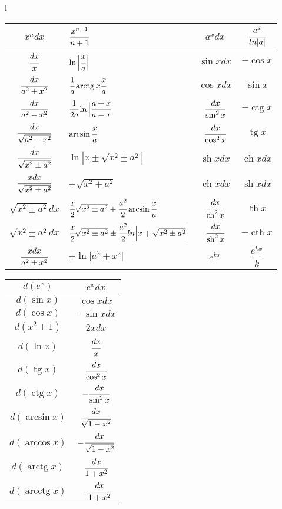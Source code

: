 

\small
\begin{tabular}{l}
	\begin{tabular}{|c|l||c|c|}
		\hline
		$x^ndx$&$\cfrac{x^{n+1}}{n+1}$&$a^xdx$&$\cfrac{a^x}{ln|a|}$\\
		\hline
		$\cfrac{dx}{x}$&$\ln\Big|\cfrac{x}{a}\Big|$&$\sin{x}dx$&$-\cos{x}$\\
		\hline
		$\cfrac{dx}{a^2+x^2}$&$\cfrac{1}{a} \operatorname{arctg} x{\cfrac{x}{a}}$&$\cos{x}dx$&$\sin{x}$\\
		\hline
		$\cfrac{dx}{a^2-x^2}$&$\cfrac{1}{2a}\ln\Big|\cfrac{a+x}{a-x}\Big|$&$\cfrac{dx}{\sin^2x}$&$-\operatorname{ctg} x$\\
		\hline
		$\cfrac{dx}{\sqrt{a^2-x^2}}$&$\arcsin\cfrac{x}{a}$&$\cfrac{dx}{\cos^2x}$&$\operatorname{tg} x$\\
		\hline
		$\cfrac{dx}{\sqrt{x^2\pm a^2}}$&$\ln|x\pm\sqrt{x^2\pm a^2}|$&$\operatorname{sh} xdx$&$\operatorname{ch} xdx$\\
		\hline
		$\cfrac{xdx}{\sqrt{x^2\pm a^2}}$&$\pm\sqrt{x^2\pm a^2}$&$\operatorname{ch}xdx$&$\operatorname{sh}xdx$\\
		\hline
		$\sqrt{x^2\pm a^2}dx$&$\cfrac{x}{2}\sqrt{x^2\pm a^2}+\cfrac{a^2}{2}\operatorname{arcsin}\cfrac{x}{a}$&$\cfrac{dx}{\operatorname{ch}^2x}$&$\operatorname{th}x$\\
		\hline
		$\sqrt{x^2\pm a^2}dx$&$\cfrac{x}{2}\sqrt{x^2\pm a^2}\pm \cfrac{a^2}{2}ln\Big|x+\sqrt{x^2\pm a^2}\Big|$&$\cfrac{dx}{\operatorname{sh}^2x}$&$-\operatorname{cth}x$\\
		\hline
		$\cfrac{xdx}{a^2\pm x^2}$&$\pm\ln\Big|a^2\pm x^2\Big|$&$e^{kx}$&$\dfrac{e^{kx}}{k}$\\
		\hline
	\end{tabular}
	\begin{tabular}{|c|c|}
		\hline
		$d(e^{x})$&$e^xdx$\\[5pt]
		\hline
		$d(\sin{x})$&$\cos{x}dx$\\[5pt]
		\hline
		$d(\cos{x})$&$-\sin{x}dx$\\[4pt]
		\hline
		$d(x^2+1)$&$2xdx$\\[5pt]
		\hline
		$d(\ln{x})$&$\cfrac{dx}{x}$\\[5pt]
		\hline
		$d(\operatorname{tg}{x})$&$\cfrac{dx}{\cos^2{x}}$\\ [4pt]
		\hline
		$d(\operatorname{ctg}x)$&$-\cfrac{dx}{\sin^2{x}}$\\[4pt]
		\hline
		$d(\arcsin{x})$&$\cfrac{dx}{\sqrt{1-x^2}}$\\[4pt]
		\hline
		$d(\arccos{x})$&$-\cfrac{dx}{\sqrt{1-x^2}}$\\[4pt]
		\hline
		$d(\operatorname{arctg}x)$&$\cfrac{dx}{1+x^2}$\\[4.4pt]
		\hline
		$d(\operatorname{arcctg}x)$&$-\cfrac{dx}{1+x^2}$\\
		\hline
	\end{tabular}\\


\end{tabular}
